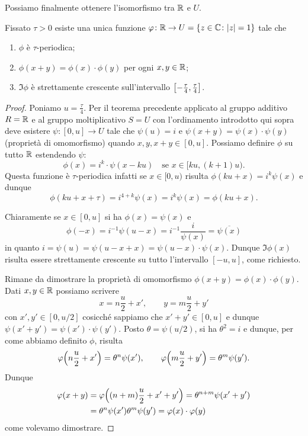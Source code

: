 Possiamo finalmente ottenere l'isomorfismo tra ${\mathbb R}$ e $U$.
\begin{theorem}
Fissato $\tau > 0$ esiste una unica funzione 
$\varphi\colon {\mathbb R} \to U = {\left\{ z\in {\mathbb C}\colon {\left|z\right|}=1 \right\}}$ 
tale che 
%
%
\begin{enumerate}
  \item $\phi$ è $\tau$-periodica;
  \item $\phi(x+y)=\phi(x)\cdot \phi(y)$ per ogni $x,y\in {\mathbb R}$;
  \item $\Im \phi$ è strettamente crescente sull'intervallo ${\left[ -\frac \tau 4,\frac \tau 4 \right]}$.
\end{enumerate}
\end{theorem}
%
\begin{proof}
  Poniamo $u=\frac{\tau}4$.
  Per il teorema precedente applicato 
  al gruppo additivo $R={\mathbb R}$ e al gruppo moltiplicativo $S=U$
  con l'ordinamento introdotto qui sopra deve esistere
  $\psi\colon[0,u]\to U$ tale che $\psi(u)=i$
  e $\psi(x+y)=\psi(x)\cdot \psi(y)$ (proprietà di omomorfismo) 
  quando $x,y,x+y \in [0,u]$.
  Possiamo definire $\phi$ su tutto ${\mathbb R}$ estendendo $\psi$:
  \[
    \phi(x) =
      i^k\cdot \psi(x-ku) \quad \text{se $x\in [k u,(k+1)u)$}.
  \]
  Questa funzione è $\tau$-periodica infatti
  se $x\in [0,u)$ risulta
  $\phi(ku+x) = i^{k} \psi(x)$
  e dunque 
  \[
    \phi(ku+x+\tau) = i^{4+k} \psi(x) = i^k \psi(x) = \phi(ku+x).
  \]

  Chiaramente se $x\in[0,u]$ 
  si ha $\phi(x) = \psi(x)$ 
  e 
  \[
    \phi(-x) = i^{-1}\psi(u-x) = i^{-1}\frac{i}{\psi(x)} = \overline{\psi(x)}
  \]
  in quanto $i=\psi(u)=\psi(u-x+x) = \psi(u-x)\cdot \psi(x)$.
  Dunque $\Im \phi(x)$ risulta essere strettamente crescente su tutto 
  l'intervallo $[-u,u]$, come richiesto.

  Rimane da dimostrare la proprietà di omomorfismo $\phi(x+y)=\phi(x)\cdot \phi(y)$. 
  Dati $x,y\in {\mathbb R}$ possiamo scrivere 
  \[
     x= n \frac u 2 + x', \qquad y=m \frac u 2 + y'
  \]
  con $x',y'\in[0,u/2]$ cosicché sappiamo che $x'+y'\in [0,u]$ 
  e dunque $\psi(x'+y') = \psi(x')\cdot \psi(y')$.
  Posto $\theta = \psi(u/2)$, si ha $\theta^2=i$ e dunque,
  per come abbiamo definito $\phi$, risulta 
  \[
    \varphi{\left( n \frac u 2 + x' \right)} = \theta^n \psi(x'),
    \qquad 
    \varphi{\left( m \frac u 2 + y' \right)} = \theta^m \psi(y').
  \]
  Dunque 
  \begin{align*}
    \varphi(x+y) 
    &= \varphi{\left( (n+m)\frac u 2+x'+y' \right)} 
    = \theta^{n+m}\psi(x'+y')\\
    &= \theta^n \psi(x') \theta^m \psi(y')
    = \varphi(x)\cdot \varphi(y)
  \end{align*}
  come volevamo dimostrare.
  \end{proof}

